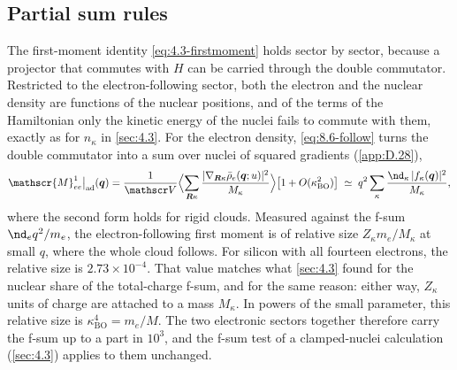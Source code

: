 \subsection{Partial sum rules}

The first-moment identity \cref{eq:4.3-firstmoment} holds sector by sector, because a projector that commutes with $H$ can be carried through the double commutator. Restricted to the electron-following sector, both the electron and the nuclear density are functions of the nuclear positions, and of the terms of the Hamiltonian only the kinetic energy of the nuclei fails to commute with them, exactly as for $n_\kappa$ in \cref{sec:4.3}. For the electron density, \cref{eq:8.6-follow} turns the double commutator into a sum over nuclei of squared gradients (\cref{app:D.28}),
\begin{equation}
  \mathscr{M}^1_{ee}\big|_{\mathrm{ad}}(\vect{q}) = \frac1\Vol\Bigl\langle\sum_{\vect{R}\kappa}\frac{|\nabla_{\vect{R}\kappa}\bar\rho_e(\vect{q};u)|^2}{M_\kappa}\Bigr\rangle\bigl[1 + O(\kappa_{\mathrm{BO}}^2)\bigr]
  \;\simeq\; q^2\sum_\kappa\frac{\nd_\kappa\,|f_\kappa(\vect{q})|^2}{M_\kappa} ,
  \label{eq:8.6-fsum-e}
\end{equation}
where the second form holds for rigid clouds. Measured against the f-sum $\nd_eq^2/m_e$, the electron-following first moment is of relative size $Z_\kappa m_e/M_\kappa$ at small $q$, where the whole cloud follows. For silicon with all fourteen electrons, the relative size is $2.73\times10^{-4}$. That value matches what \cref{sec:4.3} found for the nuclear share of the total-charge f-sum, and for the same reason: either way, $Z_\kappa$ units of charge are attached to a mass $M_\kappa$. In powers of the small parameter, this relative size is $\kappa_{\mathrm{BO}}^4 = m_e/M$. The two electronic sectors together therefore carry the f-sum up to a part in $10^3$, and the f-sum test of a clamped-nuclei calculation (\cref{sec:4.3}) applies to them unchanged.


